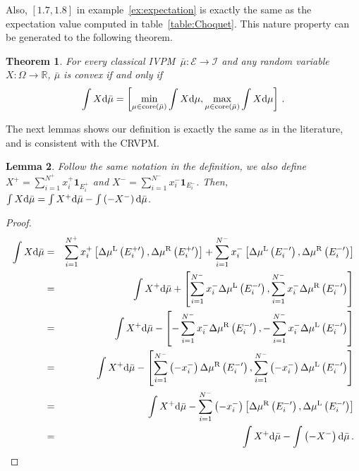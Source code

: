 \documentclass[12pt]{iopart}
\theoremstyle{plain}
\newtheorem{thm}{Theorem}
\newtheorem{lemma}[thm]{Lemma}
\theoremstyle{definition}
\theoremstyle{remark}
\newcommand{\events}{\ensuremath{\mathcal{E}}}
\newcommand{\mul}[1][]{\ensuremath{\mu^{\mathrm{L{#1}}}}}
\newcommand{\mur}[1][]{\ensuremath{\mu^{\mathrm{R{#1}}}}}
\begin{document}
Also, $\left[1.7,1.8\right]$ in example~\ref{ex:expectation} is
exactly the same as the expectation value computed in table~\ref{table:Choquet}.
This nature property can be generated to the following theorem.

\begin{thm}\label{thm:Rosenmuller}\cite{Rosenmuller1971,GilboaSchmeidler1994,Grabisch2016}For
every classical IVPM~$\bar{\mu}:\events\rightarrow\mathscr{I}$ and
any random variable~$X:\Omega\rightarrow\mathbb{R}$, $\bar{\mu}$
is convex if and only if
\begin{equation}
\int X\mathrm{d}\bar{\mu}=\left[\min_{\mu\in\mathrm{core}\left(\bar{\mu}\right)}\int X\mathrm{d}\mu,\max_{\mu\in\mathrm{core}\left(\bar{\mu}\right)}\int X\mathrm{d}\mu\right]\,.\label{eq:Rosenmuller}
\end{equation}
\end{thm}

The next lemmas shows our definition is exactly the same as in the
literature, and is consistent with the CRVPM.

\begin{lemma}Follow the same notation in the definition, we also
define $X^{+}=\sum_{i=1}^{N^{+}}x_{i}^{+}\mathbf{1}_{E_{i}^{+}}$
and $X^{-}=\sum_{i=1}^{N^{-}}x_{i}^{-}\mathbf{1}_{E_{i}^{-}}$. Then,
$\int X\mathrm{d}\bar{\mu}=\int X^{+}\mathrm{d}\bar{\mu}-\int\left(-X^{-}\right)\mathrm{d}\bar{\mu}$.\end{lemma}

\begin{proof}
\begin{eqnarray*}
\int X\rmd\bar{\mu} & = & \sum_{i=1}^{N^{+}}x_{i}^{+}\left[\Delta\mul\left(E_{i}^{+\prime}\right),\Delta\mur\left(E_{i}^{+\prime}\right)\right]+\sum_{i=1}^{N^{-}}x_{i}^{-}\left[\Delta\mul\left(E_{i}^{-\prime}\right),\Delta\mur\left(E_{i}^{-\prime}\right)\right]\\
 & = & \int X^{+}\rmd\bar{\mu}+\left[\sum_{i=1}^{N^{-}}x_{i}^{-}\Delta\mul\left(E_{i}^{-\prime}\right),\sum_{i=1}^{N^{-}}x_{i}^{-}\Delta\mur\left(E_{i}^{-\prime}\right)\right]\\
 & = & \int X^{+}\rmd\bar{\mu}-\left[-\sum_{i=1}^{N^{-}}x_{i}^{-}\Delta\mur\left(E_{i}^{-\prime}\right),-\sum_{i=1}^{N^{-}}x_{i}^{-}\Delta\mul\left(E_{i}^{-\prime}\right)\right]\\
 & = & \int X^{+}\rmd\bar{\mu}-\left[\sum_{i=1}^{N^{-}}\left(-x_{i}^{-}\right)\Delta\mur\left(E_{i}^{-\prime}\right),\sum_{i=1}^{N^{-}}\left(-x_{i}^{-}\right)\Delta\mul\left(E_{i}^{-\prime}\right)\right]\\
 & = & \int X^{+}\rmd\bar{\mu}-\sum_{i=1}^{N^{-}}\left(-x_{i}^{-}\right)\left[\Delta\mur\left(E_{i}^{-\prime}\right),\Delta\mul\left(E_{i}^{-\prime}\right)\right]\\
 & = & \int X^{+}\rmd\bar{\mu}-\int\left(-X^{-}\right)\rmd\bar{\mu}\,.
\end{eqnarray*}
\end{proof}
\end{document}

